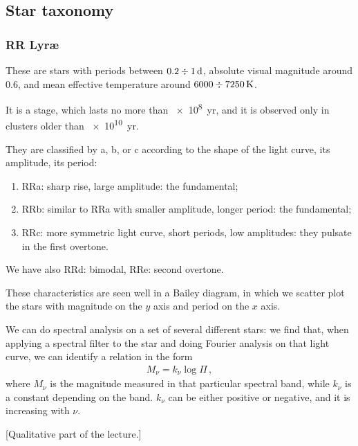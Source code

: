 \documentclass[main.tex]{subfiles}
\begin{document}
\subsection{Star taxonomy}

\subsubsection{RR Lyr\ae}

These are stars with periods between \(\num{.2} \divisionsymbol \SI{1}{d}\), absolute visual magnitude around \num{+.6}, and mean effective temperature around \( \num{6000} \divisionsymbol\SI{7250}{K}\).

It is a stage, which lasts no more than \SI{e8}{yr}, and it is observed only in clusters older than \SI{e10}{yr}.

They are classified by a, b, or c according to the shape of the light curve, its amplitude, its period:

\begin{enumerate}
  \item RRa: sharp rise, large amplitude: the fundamental;
  \item RRb: similar to RRa with smaller amplitude, longer period: the fundamental;
  \item RRc: more symmetric light curve, short periods, low amplitudes: they pulsate in the first overtone.
\end{enumerate}

We have also RRd: bimodal, RRe: second overtone.

These characteristics are seen well in a Bailey diagram, in which we scatter plot the stars with magnitude on the \(y\) axis and period on the \(x\) axis.


We can do spectral analysis on a set of several different stars: we find that, when applying a spectral filter to the star and doing Fourier analysis on that light curve, we can identify a relation in the form 
%
\begin{align}
M_\nu = k_\nu \log \Pi 
\,,
\end{align}
%
where \(M_{\nu }\) is the magnitude measured in that particular spectral band, while \(k_{\nu }\) is a constant depending on the band. \(k_{\nu }\) can be either positive or negative, and it is increasing with \(\nu \). 

[Qualitative part of the lecture.]
\end{document}
